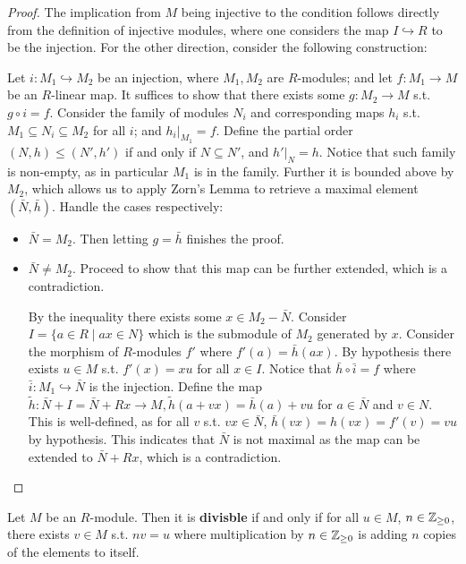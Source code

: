 \documentclass{article}
\begin{document}
\begin{proof}
    The implication from $M$ being injective to the condition follows directly from the definition of injective modules, where one considers the map $I \hookrightarrow R$ to be the injection. For the other direction, consider the following construction:

    Let $i: M_1 \hookrightarrow M_2$ be an injection, where $M_1, M_2$ are $R$-modules; and let $f: M_1 \to M$ be an $R$-linear map. It suffices to show that there exists some $g: M_2 \to M$ s.t. $g \circ i = f$. Consider the family of modules $N_i$ and corresponding maps $h_i$ s.t. $M_1 \subseteq N_i \subseteq M_2$ for all $i$; and $h_i|_{M_1} = f$. Define the partial order $(N, h) \leq (N', h')$ if and only if $N \subseteq N'$, and $h'|_N = h$. Notice that such family is non-empty, as in particular $M_1$ is in the family. Further it is bounded above by $M_2$, which allows us to apply Zorn's Lemma to retrieve a maximal element $(\bar{N}, \bar{h})$. Handle the cases respectively:
    \begin{itemize}
        \item $\bar{N} = M_2$. Then letting $g = \bar{h}$ finishes the proof.
        \item $\bar{N} \neq M_2$. Proceed to show that this map can be further extended, which is a contradiction.
        
        By the inequality there exists some $x \in M_2 - \bar{N}$. Consider $I = \{a \in R \mid ax \in N\}$ which is the submodule of $M_2$ generated by $x$. Consider the morphism of $R$-modules $f'$ where $f'(a) = \bar{h}(ax)$. By hypothesis there exists $u\in M$ s.t. $f'(x) = xu$ for all $x \in I$. Notice that $\bar{h} \circ \bar{i} = f$ where $\bar{i}: M_1 \hookrightarrow \bar{N}$ is the injection. Define the map $\tilde{h}: \bar{N} + I = \bar{N} + Rx \to M , \tilde{h}(a + vx) = \bar{h}(a) + vu$ for $a \in \bar{N}$ and $v\in N$. This is well-defined, as for all $v$ s.t. $vx \in \bar{N}$, $\bar{h}(vx) = h(vx) = f'(v) = vu$ by hypothesis. This indicates that $\bar{N}$ is not maximal as the map can be extended to $\bar{N} + Rx$, which is a contradiction.
    \end{itemize}
\end{proof}

\begin{definition}
    Let $M$ be an $R$-module. Then it is \textbf{divisble} if and only if for all $u \in M$, $n \in \mathbb{Z}_{\geq 0}$, there exists $v \in M$ s.t. $nv = u$ where multiplication by $n \in \mathbb{Z}_{\geq 0}$ is adding $n$ copies of the elements to itself.
\end{definition}
\end{document}

